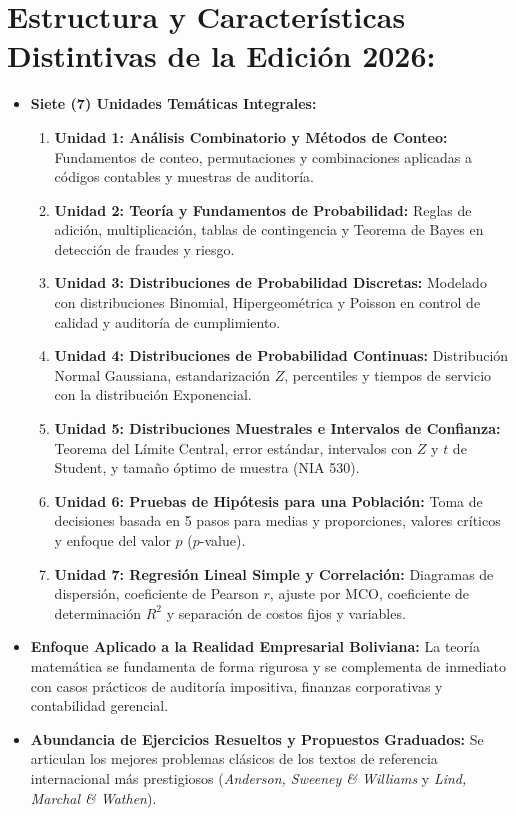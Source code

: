 \documentclass[11pt,twoside,openright]{book}
\begin{document}
\section*{Estructura y Características Distintivas de la Edición 2026:}
\begin{itemize}
    \item \textbf{Siete (7) Unidades Temáticas Integrales:}
    \begin{enumerate}
        \item \textbf{Unidad 1: Análisis Combinatorio y Métodos de Conteo:} Fundamentos de conteo, permutaciones y combinaciones aplicadas a códigos contables y muestras de auditoría.
        \item \textbf{Unidad 2: Teoría y Fundamentos de Probabilidad:} Reglas de adición, multiplicación, tablas de contingencia y Teorema de Bayes en detección de fraudes y riesgo.
        \item \textbf{Unidad 3: Distribuciones de Probabilidad Discretas:} Modelado con distribuciones Binomial, Hipergeométrica y Poisson en control de calidad y auditoría de cumplimiento.
        \item \textbf{Unidad 4: Distribuciones de Probabilidad Continuas:} Distribución Normal Gaussiana, estandarización $Z$, percentiles y tiempos de servicio con la distribución Exponencial.
        \item \textbf{Unidad 5: Distribuciones Muestrales e Intervalos de Confianza:} Teorema del Límite Central, error estándar, intervalos con $Z$ y $t$ de Student, y tamaño óptimo de muestra (NIA 530).
        \item \textbf{Unidad 6: Pruebas de Hipótesis para una Población:} Toma de decisiones basada en 5 pasos para medias y proporciones, valores críticos y enfoque del valor $p$ ($p$-value).
        \item \textbf{Unidad 7: Regresión Lineal Simple y Correlación:} Diagramas de dispersión, coeficiente de Pearson $r$, ajuste por MCO, coeficiente de determinación $R^2$ y separación de costos fijos y variables.
    \end{enumerate}
    \item \textbf{Enfoque Aplicado a la Realidad Empresarial Boliviana:} La teoría matemática se fundamenta de forma rigurosa y se complementa de inmediato con casos prácticos de auditoría impositiva, finanzas corporativas y contabilidad gerencial.
    \item \textbf{Abundancia de Ejercicios Resueltos y Propuestos Graduados:} Se articulan los mejores problemas clásicos de los textos de referencia internacional más prestigiosos (\textit{Anderson, Sweeney \& Williams} y \textit{Lind, Marchal \& Wathen}).
\end{itemize}
\end{document}
